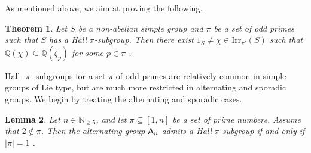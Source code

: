 \documentclass[12pt]{amsart}
\newtheorem{theorem}{Theorem}[section]
\newtheorem{lemma}[theorem]{Lemma}
\theoremstyle{definition}
\numberwithin{equation}{section}
\newcommand{\Irr}{{\mathrm {Irr}}}
\newcommand{\QQ}{{\mathbb Q}}
\newcommand{\Al}{\textup{\textsf{A}}}
\begin{document}
As mentioned above, we aim at %
proving the following.

\begin{theorem}\label{thm:simple}
Let %
$S$ be a non-abelian simple group and $\pi$ be a set of odd
primes such that $S$ has a Hall $\pi$-subgroup. Then %
there exist
$1_S\neq\chi\in\Irr_{\pi'}(S)$ %
such that
$\QQ(\chi)\subseteq\QQ(\zeta_p)$ for some $p\in\pi$%
.
\end{theorem}


Hall -$\pi$%
-subgroups for a set $\pi$ of odd primes are relatively
common in simple groups of Lie type, but are much more restricted in
alternating and sporadic groups. We begin by treating the
alternating and sporadic cases.

\begin{lemma}\label{lem:noHall}
Let $n\in\mathbb{N}_{\geq 5}$, and %
let $\pi\subseteq [1,n]$ be a set
of prime numbers. Assume that $2\notin\pi$. Then the alternating
group $\Al_n$ admits a Hall $\pi$-subgroup if and only if $|\pi|=1$%
.
\end{lemma}
\end{document}
